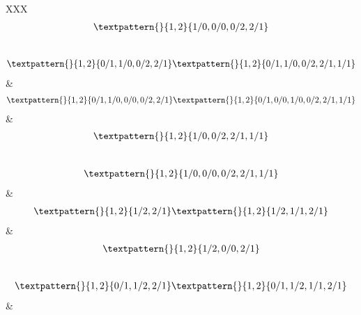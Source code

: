 \begin{center}
\begin{longtabu}[l]{XXX}
\begin{equation}
	\begin{gathered}
		\textpattern{}{1,2}{1/0,0/0,0/2,2/1}
	\end{gathered}
	\label{cls:36}
\end{equation}
\\
\begin{equation}
	\begin{gathered}
		\textpattern{}{1,2}{0/1,1/0,0/2,2/1}
		\textpattern{}{1,2}{0/1,1/0,0/2,2/1,1/1}
	\end{gathered}
	\label{cls:37}
\end{equation}
    &
\begin{equation}
	\begin{gathered}
		\textpattern{}{1,2}{0/1,1/0,0/0,0/2,2/1}
		\textpattern{}{1,2}{0/1,0/0,1/0,0/2,2/1,1/1}
	\end{gathered}
	\label{cls:38}
\end{equation}
    &
\begin{equation}
	\begin{gathered}
		\textpattern{}{1,2}{1/0,0/2,2/1,1/1}
	\end{gathered}
	\label{cls:39}
\end{equation}
\\
\begin{equation}
	\begin{gathered}
		\textpattern{}{1,2}{1/0,0/0,0/2,2/1,1/1}
	\end{gathered}
	\label{cls:40}
\end{equation}
    &
\begin{equation}
	\begin{gathered}
		\textpattern{}{1,2}{1/2,2/1}
		\textpattern{}{1,2}{1/2,1/1,2/1}
	\end{gathered}
	\label{cls:41}
\end{equation}
    &
\begin{equation}
	\begin{gathered}
		\textpattern{}{1,2}{1/2,0/0,2/1}
	\end{gathered}
	\label{cls:42}
\end{equation}
\\
\begin{equation}
	\begin{gathered}
		\textpattern{}{1,2}{0/1,1/2,2/1}
		\textpattern{}{1,2}{0/1,1/2,1/1,2/1}
	\end{gathered}
	\label{cls:43}
\end{equation}
    &
\begin{equation}
	\begin{gathered}

\end{gathered}
\end{equation}
\end{longtabu}
\end{center}
